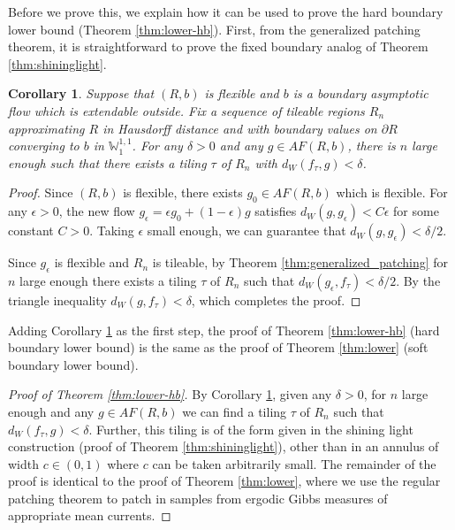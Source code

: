 \documentclass[11pt]{article}
\newtheorem{cor}[thm]{Corollary}
\theoremstyle{remark}
\theoremstyle{definition}
\newcommand{\m}[1]{\mathbb{#1}}
\begin{document}
Before we prove this, we explain how it can be used to prove the hard boundary lower bound (Theorem \ref{thm:lower-hb}). First, from the generalized patching theorem, it is straightforward to prove the fixed boundary analog of Theorem \ref{thm:shininglight}. 
\begin{cor}\label{cor:fixed bc}
    Suppose that $(R,b)$ is flexible and $b$ is a boundary asymptotic flow which is extendable outside. Fix a sequence of tileable regions $R_n$ approximating $R$ in Hausdorff distance and with boundary values on $\partial R$ converging to $b$ in $\m W_1^{1,1}$. For any $\delta>0$ and any $g\in AF(R,b)$, there is $n$ large enough such that there exists a tiling $\tau$ of $R_n$ with $d_W(f_{\tau},g) < \delta$.
\end{cor}
\begin{proof}
    Since $(R,b)$ is flexible, there exists $g_0\in AF(R,b)$ which is flexible. For any $\epsilon > 0$, the new flow $g_\epsilon = \epsilon g_0 + (1-\epsilon) g$ satisfies $d_W(g,g_\epsilon) < C \epsilon$ for some constant $C>0$. Taking $\epsilon$ small enough, we can guarantee that $d_W(g,g_\epsilon)< \delta/2$. 

    Since $g_\epsilon$ is flexible and $R_n$ is tileable, by Theorem \ref{thm:generalized_patching} for $n$ large enough there exists a tiling $\tau$ of $R_n$ such that $d_W(g_\epsilon, f_\tau)<\delta/2$. By the triangle inequality $d_W(g,f_\tau)< \delta$, which completes the proof.
\end{proof}
Adding Corollary \ref{cor:fixed bc} as the first step, the proof of Theorem \ref{thm:lower-hb} (hard boundary lower bound) is the same as the proof of Theorem \ref{thm:lower} (soft boundary lower bound).
\begin{proof}[Proof of Theorem \ref{thm:lower-hb}]
    By Corollary \ref{cor:fixed bc}, given any $\delta >0$, for $n$ large enough and any $g\in AF(R,b)$ we can find a tiling $\tau$ of $R_n$ such that $d_W(f_\tau,g)<\delta$. Further, this tiling is of the form given in the shining light construction (proof of Theorem \ref{thm:shininglight}), other than in an annulus of width $c\in(0,1)$ where $c$ can be taken arbitrarily small. The remainder of the proof is identical to the proof of Theorem \ref{thm:lower}, where we use the regular patching theorem to patch in samples from ergodic Gibbs measures of appropriate mean currents. 
\end{proof}
\end{document}
